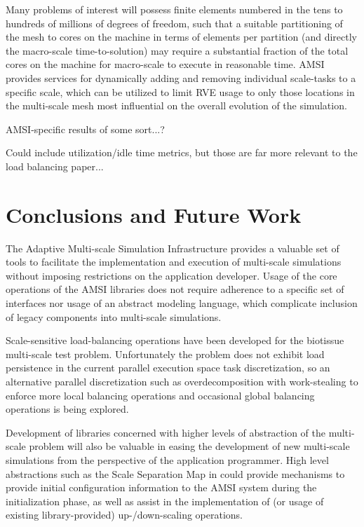 \documentclass[11pt]{article}
\begin{document}
Many problems of interest will possess finite elements numbered in the tens to hundreds of millions of degrees of freedom, such that a suitable partitioning of the mesh to cores on the machine in terms of elements per partition (and directly the macro-scale time-to-solution) may require a substantial fraction of the total cores on the machine for macro-scale to execute in reasonable time. AMSI provides services for dynamically adding and removing individual scale-tasks to a specific scale, which can be utilized to limit RVE usage to only those locations in the multi-scale mesh most influential on the overall evolution of the simulation.

AMSI-specific results of some sort...?

Could include utilization/idle time metrics, but those are far more relevant to the load balancing paper...

\section{Conclusions and Future Work}\label{future_work}

The Adaptive Multi-scale Simulation Infrastructure provides a valuable set of tools to facilitate the implementation and execution of multi-scale simulations without imposing restrictions on the application developer. Usage of the core operations of the AMSI libraries does not require adherence to a specific set of interfaces nor usage of an abstract modeling language, which complicate inclusion of legacy components into multi-scale simulations.

Scale-sensitive load-balancing operations have been developed for the biotissue multi-scale test problem. Unfortunately the problem does not exhibit load persistence in the current parallel execution space task discretization, so an alternative parallel discretization such as overdecomposition with work-stealing to enforce more local balancing operations and occasional global balancing operations is being explored.

Development of libraries concerned with higher levels of abstraction of the multi-scale problem will also be valuable in easing the development of new multi-scale simulations from the perspective of the application programmer. High level abstractions such as the Scale Separation Map in \cite{chopard2011framework} could provide mechanisms to provide initial configuration information to the AMSI system during the initialization phase, as well as assist in the implementation of (or usage of existing library-provided) up-/down-scaling operations.
\end{document}

